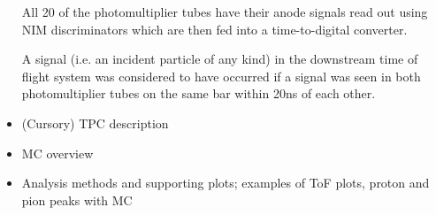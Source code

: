 \begin{itemize}
    All 20 of the photomultiplier tubes have their anode signals read out using NIM discriminators which are then fed into a time-to-digital converter. 
    
    A signal (i.e. an incident particle of any kind) in the downstream time of flight system was considered to have occurred if a signal was seen in both photomultiplier tubes on the same bar within 20ns of each other.
    
\item (Cursory) TPC description
\item MC overview
\item Analysis methods and supporting plots; examples of ToF plots, proton and pion peaks with MC
\end{itemize}
